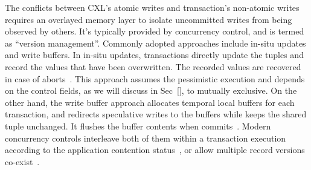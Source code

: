 




\ifx\stale\undefined

The conflicts between CXL's atomic writes and transaction's non-atomic writes requires an overlayed memory layer to isolate uncommitted writes from being observed by others. It's typically provided by concurrency control, and is termed as ``version management''. 
Commonly adopted approaches include in-situ updates and write buffers. In in-situ updates, transactions directly update the tuples and record the values that have been overwritten. The recorded values are recovered in case of aborts~\cite{s2pl_csur81, abyss_vldb14}. This approach assumes the pessimistic execution and depends on the control fields, as we will discuss in Sec~\ref{}, to mutually exclusive. 
On the other hand, the write buffer approach allocates temporal local buffers for each transaction, and redirects speculative writes to the buffers while keeps the shared tuple unchanged. It flushes the buffer contents when commits~\cite{silo_sosp13, hekaton_sigmod13, occ_tbs81, farm_nsdi14}. 
Modern concurrency controls interleave both of them within a transaction execution according to the application contention status~\cite{tictoc, polyjuice_osdi21, cormcc_atc18}, or allow multiple record versions co-exist~\cite{mvcc, mvcc_vldb17}. 

